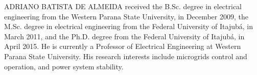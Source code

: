 \documentclass{ieeeaccess}
\begin{document}
	\begin{IEEEbiography}{ADRIANO BATISTA DE ALMEIDA}
		 received the B.Sc. degree in electrical engineering from the Western Parana State University, in December 2009, the M.Sc. degree in electrical engineering from the Federal University of Itajubá, in March 2011, and the Ph.D. degree from the Federal University of Itajubá, in April 2015. He is currently a Professor of Electrical Engineering at Western Parana State University. His research interests include microgrids control and operation, and power system stability.
	\end{IEEEbiography}

    \EOD
\end{document}
